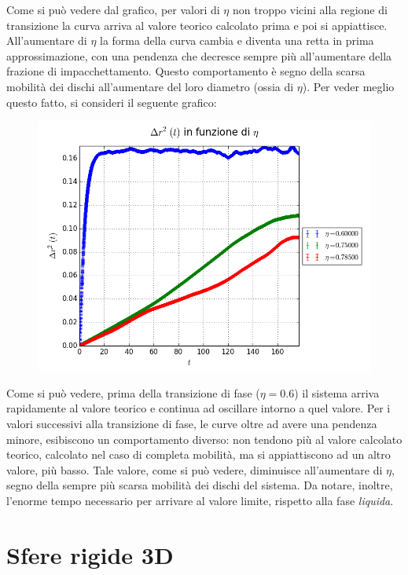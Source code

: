 Come si può vedere dal grafico, per valori di $\eta$ non troppo vicini alla regione di transizione la curva arriva al valore teorico calcolato prima e poi si appiattisce. All'aumentare di $\eta$ la forma della curva cambia e diventa una retta in prima approssimazione, con una pendenza che decresce sempre più all'aumentare della frazione di impacchettamento. Questo comportamento è segno della scarsa mobilità dei dischi all'aumentare del loro diametro (ossia di $\eta$).
Per veder meglio questo fatto, si consideri il seguente grafico:
\begin{center}
	\begin{figure}[h!]
		\centering
		\includegraphics[scale=0.5]{sfere2D/dr2cfr.png}
	\end{figure}
\end{center}

Come si può vedere, prima della transizione di fase ($\eta=0.6$) il sistema arriva rapidamente al valore teorico e continua ad oscillare intorno a quel valore.
Per i valori successivi alla transizione di fase, le curve oltre ad avere una pendenza minore, esibiscono un comportamento diverso: non tendono più al valore calcolato teorico, calcolato nel caso di completa mobilità, ma si appiattiscono ad un altro valore, più basso.
Tale valore, come si può vedere, diminuisce all'aumentare di $\eta$, segno della sempre più scarsa mobilità dei dischi del sistema.
Da notare, inoltre, l'enorme tempo necessario per arrivare al valore limite, rispetto alla fase \emph{liquida}.


\newpage
\section{Sfere rigide 3D}

